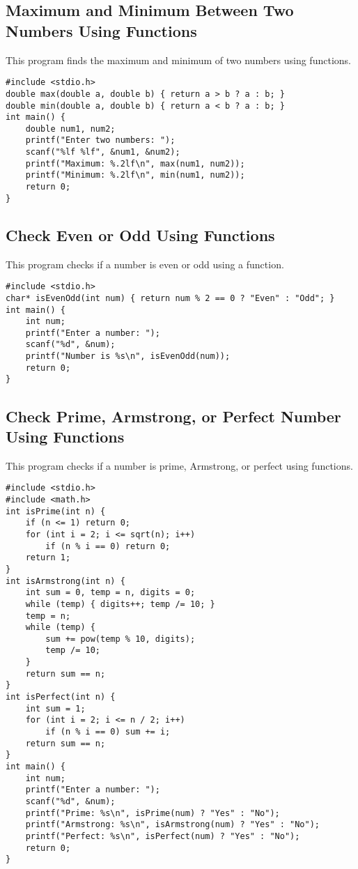 \documentclass[a4paper,12pt]{article}
\begin{document}
\subsection{Maximum and Minimum Between Two Numbers Using Functions}
This program finds the maximum and minimum of two numbers using functions.
\begin{lstlisting}[caption={Maximum and Minimum Between Two Numbers Using Functions}]
#include <stdio.h>
double max(double a, double b) { return a > b ? a : b; }
double min(double a, double b) { return a < b ? a : b; }
int main() {
    double num1, num2;
    printf("Enter two numbers: ");
    scanf("%lf %lf", &num1, &num2);
    printf("Maximum: %.2lf\n", max(num1, num2));
    printf("Minimum: %.2lf\n", min(num1, num2));
    return 0;
}
\end{lstlisting}
\clearpage

\subsection{Check Even or Odd Using Functions}
This program checks if a number is even or odd using a function.
\begin{lstlisting}[caption={Check Even or Odd Using Functions}]
#include <stdio.h>
char* isEvenOdd(int num) { return num % 2 == 0 ? "Even" : "Odd"; }
int main() {
    int num;
    printf("Enter a number: ");
    scanf("%d", &num);
    printf("Number is %s\n", isEvenOdd(num));
    return 0;
}
\end{lstlisting}
\clearpage

\subsection{Check Prime, Armstrong, or Perfect Number Using Functions}
This program checks if a number is prime, Armstrong, or perfect using functions.
\begin{lstlisting}[caption={Check Prime, Armstrong, or Perfect Number Using Functions}]
#include <stdio.h>
#include <math.h>
int isPrime(int n) {
    if (n <= 1) return 0;
    for (int i = 2; i <= sqrt(n); i++)
        if (n % i == 0) return 0;
    return 1;
}
int isArmstrong(int n) {
    int sum = 0, temp = n, digits = 0;
    while (temp) { digits++; temp /= 10; }
    temp = n;
    while (temp) {
        sum += pow(temp % 10, digits);
        temp /= 10;
    }
    return sum == n;
}
int isPerfect(int n) {
    int sum = 1;
    for (int i = 2; i <= n / 2; i++)
        if (n % i == 0) sum += i;
    return sum == n;
}
int main() {
    int num;
    printf("Enter a number: ");
    scanf("%d", &num);
    printf("Prime: %s\n", isPrime(num) ? "Yes" : "No");
    printf("Armstrong: %s\n", isArmstrong(num) ? "Yes" : "No");
    printf("Perfect: %s\n", isPerfect(num) ? "Yes" : "No");
    return 0;
}
\end{lstlisting}
\clearpage
\end{document}
